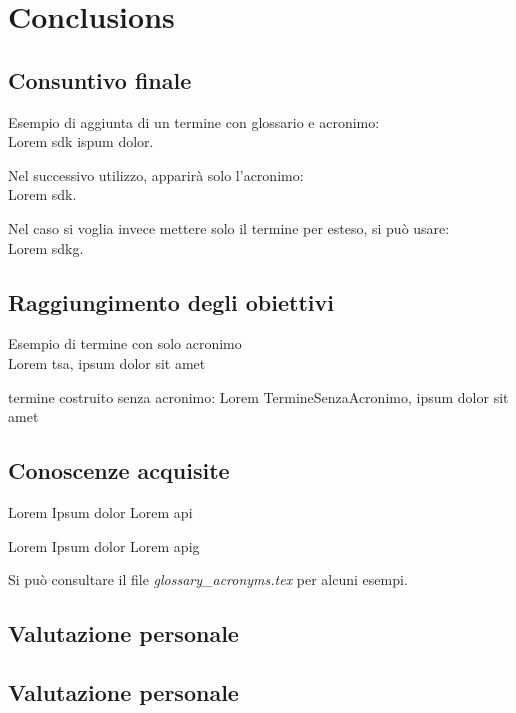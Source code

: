 \chapter{Conclusions}
\label{chap:conclusions}

\section{Consuntivo finale}
Esempio di aggiunta di un termine con glossario e acronimo:\\
Lorem \gls{sdk} ispum dolor.

Nel successivo utilizzo, apparirà solo l'acronimo:\\
Lorem \gls{sdk}.

Nel caso si voglia invece mettere solo il termine per esteso, si può usare:\\
Lorem \gls{sdkg}.

\section{Raggiungimento degli obiettivi}
Esempio di termine con solo acronimo\\
Lorem \gls{tsa}, ipsum dolor sit amet

termine costruito senza acronimo:
Lorem \gls{TermineSenzaAcronimo}, ipsum dolor sit amet

\section{Conoscenze acquisite}
Lorem Ipsum dolor Lorem \gls{api}

Lorem Ipsum dolor Lorem \gls{apig}

Si può consultare il file \textit{glossary\_acronyms.tex} per alcuni esempi.

\section{Valutazione personale}


\section{Valutazione personale}


\newpage